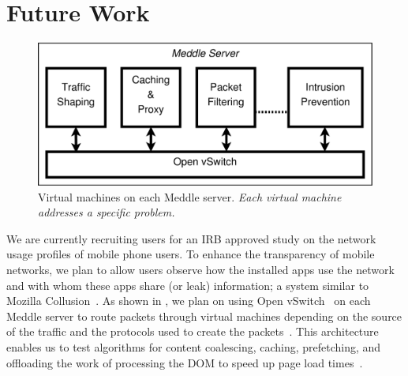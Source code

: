 \documentclass{sig-alternate-10pt}
\newcommand{\meddle}{{Meddle}\xspace}
\renewcommand{\fref}{\Fref}
\begin{document}
\section{Future Work}


\begin{figure}
 \centering
 \includegraphics[width=0.65\columnwidth]{figures/OpenSwitch.pdf}
 \caption{Virtual machines on each \meddle server. \emph{Each virtual
     machine addresses a specific problem.}}
 \label{fig:OpenSwitch}
\vspace{-0.09in}
\end{figure}

We are currently recruiting users for an IRB approved study on the
network usage profiles of mobile phone users. To enhance the
transparency of mobile networks, we plan to allow users observe how
the installed apps use the network and with whom these apps share (or
leak) information; a system similar to Mozilla
Collusion~\cite{collusion}. As shown in \fref{fig:OpenSwitch},
we plan on using Open vSwitch~\cite{Openvswitch} on each \meddle
server to route packets through virtual machines depending on the
source of the traffic and the protocols used to create the
packets~\cite{Sekar:2012:ConsolidatedMBox}. This architecture enables
us to test algorithms for content coalescing, caching, prefetching,
and offloading the work of processing the DOM to speed up page load
times~\cite{silk,opera-mini,google-spdy}.




\end{document}
